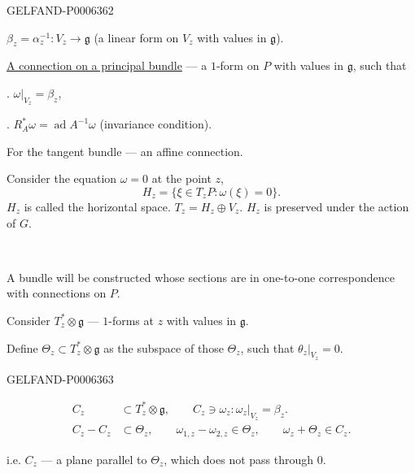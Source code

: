 \begin{GelfandAdjacentEvidence}{GELFAND-P000636}{2}


\(\beta_z=\alpha_z^{-1}:V_z\to\mathfrak g\)
(a linear form on \(V_z\) with values in \(\mathfrak g\)).

\underline{A connection on a principal bundle} --- a \(1\)-form on \(P\) with values in \(\mathfrak g\), such that

. \(\omega|_{V_z}=\beta_z\),

. \(R_A^*\omega=\operatorname{ad}A^{-1}\omega\) (invariance condition).

For the tangent bundle --- an affine connection.

Consider the equation \(\omega=0\) at the point \(z\),
\[
H_z=\{\xi\in T_zP:\omega(\xi)=0\}.
\]
\(H_z\) is called the horizontal space.
\(T_z=H_z\oplus V_z\).
\(H_z\) is preserved under the action of \(G\).

\begin{center}\textemdash\,\textperiodcentered\,\textemdash\end{center}

A bundle will be constructed whose sections are in one-to-one correspondence with connections on \(P\).

Consider \(T_z^*\otimes\mathfrak g\) --- \(1\)-forms at \(z\) with values in \(\mathfrak g\).

Define \(\Theta_z\subset T_z^*\otimes\mathfrak g\) as the subspace of those \(\Theta_z\), such that
\(\theta_z|_{V_z}=0\).
\end{GelfandAdjacentEvidence}
\begin{GelfandAdjacentEvidence}{GELFAND-P000636}{3}


\[
\begin{aligned}
C_z&\subset T_z^*\otimes\mathfrak g,\qquad C_z\ni\omega_z:\omega_z|_{V_z}=\beta_z.\\
C_z-C_z&\subset\Theta_z,\qquad
\omega_{1,z}-\omega_{2,z}\in\Theta_z,\qquad
\omega_z+\Theta_z\in C_z.
\end{aligned}
\]
\end{GelfandAdjacentEvidence}


i.e. \(C_z\) --- a plane parallel to \(\Theta_z\), which does not pass through \(0\).

